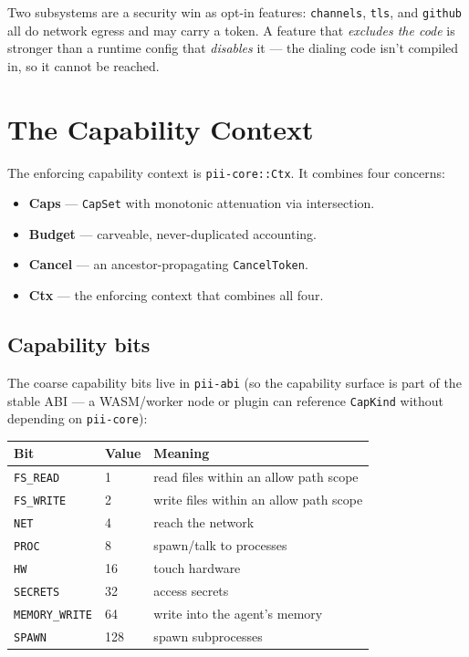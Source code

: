 \documentclass[
	fontsize=10pt,
	twoside=false,
	secnumdepth=2,
	open=any,
]{kaobook}
\begin{document}
\begin{decbox}
Two subsystems are a security win as opt-in features: \texttt{channels},
\texttt{tls}, and \texttt{github} all do network egress and may carry a
token. A feature that \emph{excludes the code} is stronger than a runtime
config that \emph{disables} it — the dialing code isn't compiled in, so it
cannot be reached.
\end{decbox}

\chapter{The Capability Context}
\label{chap:ctx}

The enforcing capability context is \texttt{pii-core::Ctx}. It combines
four concerns:

\begin{itemize}
    \item \textbf{Caps} — \texttt{CapSet} with monotonic attenuation via
        intersection.
    \item \textbf{Budget} — carveable, never-duplicated accounting.
    \item \textbf{Cancel} — an ancestor-propagating \texttt{CancelToken}.
    \item \textbf{Ctx} — the enforcing context that combines all four.
\end{itemize}

\section{Capability bits}

The coarse capability bits live in \texttt{pii-abi} (so the capability
surface is part of the stable ABI — a WASM/worker node or plugin can
reference \texttt{CapKind} without depending on \texttt{pii-core}):

\begin{longtable}{@{}lll@{}}
\toprule
\textbf{Bit} & \textbf{Value} & \textbf{Meaning} \\
\midrule
\endhead
\texttt{FS\_READ} & 1 & read files within an allow path scope \\
\texttt{FS\_WRITE} & 2 & write files within an allow path scope \\
\texttt{NET} & 4 & reach the network \\
\texttt{PROC} & 8 & spawn/talk to processes \\
\texttt{HW} & 16 & touch hardware \\
\texttt{SECRETS} & 32 & access secrets \\
\texttt{MEMORY\_WRITE} & 64 & write into the agent's memory \\
\texttt{SPAWN} & 128 & spawn subprocesses \\
\bottomrule
\end{longtable}
\end{document}
